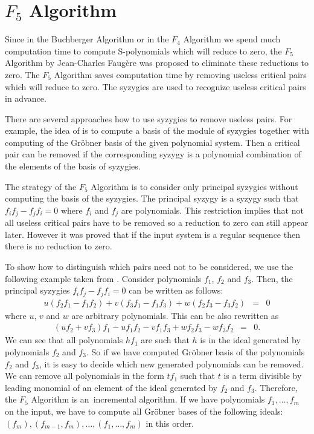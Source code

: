 \section{$F_5$ Algorithm}
Since in the Buchberger Algorithm or in the $F_4$ Algorithm we spend much computation time to compute S-polynomials which will reduce to zero, the $F_5$ Algorithm \cite{F5} by Jean-Charles Faug\`ere was proposed to eliminate these reductions to zero. The $F_5$ Algorithm saves computation time by removing useless critical pairs which will reduce to zero. The syzygies \cite{Cox-Little-Shea97} are used to recognize useless critical pairs in advance.

There are several approaches how to use syzygies to remove useless pairs. For example, the idea of \cite{GBSyzygies} is to compute a basis of the module of syzygies together with computing of the Gr\"obner basis of the given polynomial system. Then a critical pair can be removed if the corresponding syzygy is a polynomial combination of the elements of the basis of syzygies.

The strategy of the $F_5$ Algorithm is to consider only principal syzygies without computing the basis of the syzygies. The principal syzygy is a syzygy such that $f_if_j - f_jf_i = 0$ where $f_i$ and $f_j$ are polynomials. This restriction implies that not all useless critical pairs have to be removed so a reduction to zero can still appear later. However it was proved that if the input system is a regular sequence \cite{Cox-Little-Shea97} then there is no reduction to zero.

To show how to distinguish which pairs need not to be considered, we use the following example taken from \cite{F5}. Consider polynomials $f_1$, $f_2$ and $f_3$. Then, the principal syzygies $f_if_j - f_jf_i = 0$ can be written as follows:
\begin{eqnarray}
  u(f_2f_1 - f_1f_2) + v(f_3f_1 - f_1f_3) + w(f_2f_3 - f_3f_2) &=& 0
\end{eqnarray}
where $u$, $v$ and $w$ are arbitrary polynomials. This can be also rewritten as
\begin{eqnarray}
  (uf_2 + vf_3)f_1 - uf_1f_2 - vf_1f_3 + wf_2f_3 - wf_3f_2 &=& 0.
\end{eqnarray}
We can see that all polynomials $hf_1$ are such that $h$ is in the ideal generated by polynomials $f_2$ and $f_3$. So if we have computed Gr\"obner basis of the polynomials $f_2$ and $f_3$, it is easy to decide which new generated polynomials can be removed. We can remove all polynomials in the form $t f_1$ such that $t$ is a term divisible by leading monomial of an element of the ideal generated by $f_2$ and $f_3$. Therefore, the $F_5$ Algorithm is an~incremental algorithm. If we have polynomials $f_1, \dots, f_m$ on the input, we have to compute all Gr\"obner bases of the following ideals: $(f_m), (f_{m-1}, f_m), \dots, (f_1, \dots, f_m)$ in this order.

